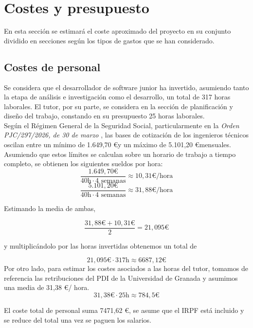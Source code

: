 \section{Costes y presupuesto}
En esta sección se estimará el coste aproximado del proyecto en su conjunto dividido en secciones según los tipos de gastos que se han considerado.


\subsection{Costes de personal}

 Se considera que el desarrollador de software junior ha invertido, asumiendo tanto la etapa de análisis e investigación como el desarrollo, un total de 317 horas laborales. El tutor, por su parte, se considera en la sección de planificación y diseño del trabajo, constando en su presupuesto 25 horas laborales.\\

Según el Régimen General de la Seguridad Social, particularmente en la \textit{Orden PJC/297/2026, de 30 de marzo} \cite{ministeriodelapresidenciajusticiayrelacionesconlascortesOrdenPJC2972026}, las bases de cotización de los ingenieros técnicos oscilan entre un mínimo de 1.649,70 \euro y un máximo de 5.101,20 \euro mensuales. Asumiendo que estos límites se calculan sobre un horario de trabajo a tiempo completo, se obtienen los siguientes sueldos por hora:\\
\[
\frac{1.649,70 \euro}{40 \text{h} \cdot 4  \text{ semanas}} \approx 10,31 \euro / \text{hora}
\]
\[
\frac{5.101,20 \euro}{40 \text{h} \cdot 4  \text{ semanas}} \approx 31,88 \euro / \text{hora}
\]

Estimando la media de ambas,

\[
\frac{31,88\euro + 10,31\euro}{2} = 21,095\euro
\]

y multiplicándolo por las horas invertidas obtenemos un total de 

\[
	21,095\euro \cdot 317\text{h} \approx 6687,12 \euro
\]
 Por otro lado, para estimar los costes asociados a las horas del tutor, tomamos de referencia las retribuciones del PDI de la Universidad de Granada \cite{ServicioHabilitacionSeguridad} y asumimos una media de 31,38 \euro / hora. 
\[ 
 	31,38\euro \cdot 25\text{h} \approx 784,5 \euro
\]

El coste total de personal suma 7471,62 \euro, se asume que el IRPF está incluido y se reduce del total una vez se paguen los salarios.
 
